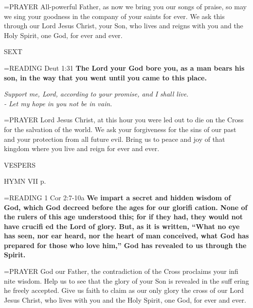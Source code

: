 \hangindent=\parindent \small{PRAYER  All-powerful Father, as now we bring you our songs of praise, so may we sing your goodness in the company of your saints for ever.  We ask this through our Lord Jesus Christ, your Son, who lives and reigns with you and the Holy Spirit, one God, for ever and ever.}

\begin{flushleft}\normalsize SEXT\\\end{flushleft}

\hangindent=\parindent \small{READING} Deut 1:31 \textbf{The Lord your God bore you, as a man bears his son, in the way that you went until you came to this place.  }

\begin{center}
\textit{Support me, Lord, according to your promise, and I shall live.\\
- Let my hope in you not be in vain.}
\end{center}

\hangindent=\parindent \small{PRAYER  Lord Jesus Christ, at this hour you were led out to die on the Cross for the salvation of the world. We ask your forgiveness for the sins of our past and your protection from all future evil. Bring us to peace and joy of that kingdom where you live and reign for ever and ever.}

\begin{flushleft}\normalsize VESPERS\\\end{flushleft}

HYMN VII p. \pageref{ordinaryTime:lastHymn}

\hangindent=\parindent \small{READING} 1 Cor 2:7-10a \textbf{We impart a secret and hidden wisdom of God, which God decreed before the ages for our glorifi cation. None of the rulers of this age understood this; for if they had, they would not have crucifi ed the Lord of glory. But, as it is written, “What no eye has seen, nor ear heard, nor the heart of man conceived, what God has prepared for those who love him,” God has revealed to us through the Spirit.\\}

\hangindent=\parindent \small{PRAYER  God our Father, the contradiction of the Cross proclaims your infi nite wisdom. Help us to see that the glory of your Son is revealed in the suff ering he freely accepted. Give us faith to claim as our only glory the cross of our Lord Jesus Christ, who lives with you and the Holy Spirit, one God, for ever and ever.}

